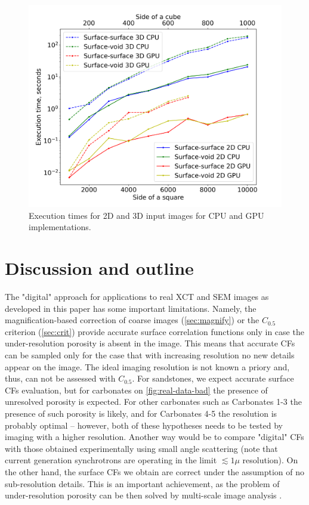 \documentclass[reprint,amsmath,amssymb,aps,pre,showkeys,showpacs]{revtex4-1}
\begin{document}
\begin{figure}[ht]
  \centering
  \includegraphics[width=\linewidth]{images/exec-time.png}
  \caption[]{Execution times for 2D and 3D input images for CPU and GPU implementations.}
  \label{fig:exec-times}
\end{figure}

\section{Discussion and outline}
\label{sec:outline}
The "digital" approach for applications to real XCT and SEM images as developed
in this paper has some important limitations. Namely, the magnification-based
correction of coarse images (\cref{sec:magnify}) or the $C_{0.5}$ criterion
(\cref{sec:crit}) provide accurate surface correlation functions only in case
the under-resolution porosity is absent in the image. This means that accurate
CFs can be sampled only for the case that with increasing resolution no new
details appear on the image. The ideal imaging resolution is not known a priory
and, thus, can not be assessed with $C_{0.5}$. For sandstones, we expect
accurate surface CFs evaluation, but for carbonates on \cref{fig:real-data-bad}
the presence of unresolved porosity is expected. For other carbonates such as
Carbonates 1-3 the presence of such porosity is likely, and for Carbonates 4-5
the resolution is probably optimal -- however, both of these hypotheses needs to
be tested by imaging with a higher resolution. Another way would be to compare
"digital" CFs with those obtained experimentally using small angle scattering
(note that current generation synchrotrons are operating in the limit
$\lesssim 1 \mu$ resolution). On the other hand, the surface CFs we obtain are
correct under the assumption of no sub-resolution details. This is an important
achievement, as the problem of under-resolution porosity can be then solved by
multi-scale image analysis \cite{moctezuma2002,SciRep1}.
\end{document}
